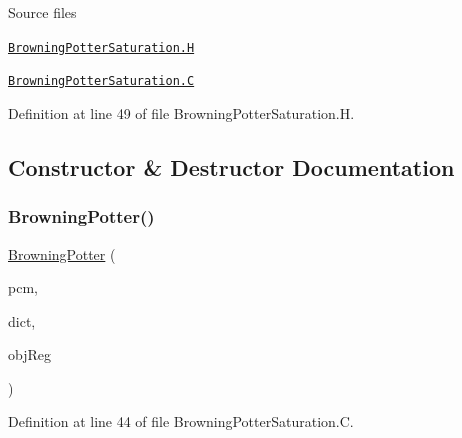\label{_Description}%
 \begin{DoxyParagraph}{Source files}

\begin{DoxyItemize}
\item \href{../../../home/carlo/data/GeN-Foam/GeN-Foam_ffn/GeN-Foam/GeN-Foam/classes/thermalHydraulics/src/physicsModels/phaseChangeModels/saturationModels/BrowningPotter/BrowningPotterSaturation.H}{\tt Browning\+Potter\+Saturation.\+H} 
\item \href{../../../home/carlo/data/GeN-Foam/GeN-Foam_ffn/GeN-Foam/GeN-Foam/classes/thermalHydraulics/src/physicsModels/phaseChangeModels/saturationModels/BrowningPotter/BrowningPotterSaturation.C}{\tt Browning\+Potter\+Saturation.\+C} 
\end{DoxyItemize}
\end{DoxyParagraph}


Definition at line 49 of file Browning\+Potter\+Saturation.\+H.



\subsection{Constructor \& Destructor Documentation}
\mbox{\label{classFoam_1_1saturationModels_1_1BrowningPotter_aa68c046ff0f8e8b975cc1ae9ce80a78c}} 
\subsubsection{\texorpdfstring{Browning\+Potter()}{BrowningPotter()}}
{\footnotesize\ttfamily \hyperlink{classFoam_1_1saturationModels_1_1BrowningPotter}{Browning\+Potter} (\begin{DoxyParamCaption}\item[{const \hyperlink{classFoam_1_1phaseChangeModel}{phase\+Change\+Model} \&}]{pcm,  }\item[{const dictionary \&}]{dict,  }\item[{const object\+Registry \&}]{obj\+Reg }\end{DoxyParamCaption})}



Definition at line 44 of file Browning\+Potter\+Saturation.\+C.



